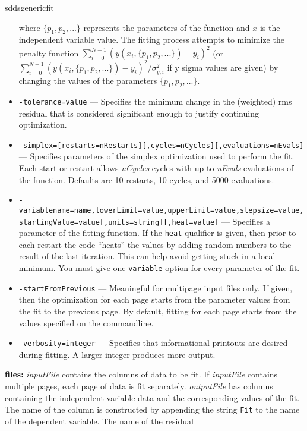 \begin{sddsprog}{sddsgenericfit}
\begin{itemize}
        where $\{p_1, p_2, ...\}$ represents the parameters of the function and $x$ is the independent variable value.
        The fitting process attempts to minimize the penalty function $\sum_{i=0}^{N-1} (y(x_i, \{p_1, p_2, ...\}) - y_i)^2$
        (or $\sum_{i=0}^{N-1} (y(x_i, \{p_1, p_2, ...\}) - y_i)^2/\sigma_{y,i}^2$ if y sigma values are given)
        by changing the values of the parameters $\{p_1, p_2, ...\}$.
      \item \verb|-tolerance=value| --- Specifies the minimum change in the (weighted) rms residual that is considered
        significant enough to justify continuing optimization.
      \item \verb|-simplex=[restarts=nRestarts][,cycles=nCycles][,evaluations=nEvals]| --- Specifies parameters of the simplex optimization used to perform the fit.
        Each start or restart allows \emph{nCycles} cycles with up to \emph{nEvals} evaluations of the function.
        Defaults are 10 restarts, 10 cycles, and 5000 evaluations.
      \item \verb|-variablename=name,lowerLimit=value,upperLimit=value,stepsize=value,startingValue=value[,units=string][,heat=value]| ---
        Specifies a parameter of the fitting function. If the \verb|heat| qualifier is given, then prior to each restart the code ``heats'' the values by adding random
        numbers to the result of the last iteration. This can help avoid getting stuck
        in a local minimum. You must give one \verb|variable| option for every parameter of the fit.
      \item \verb|-startFromPrevious| --- Meaningful for multipage input files only. If given,
        then the optimization for each page starts from the parameter values from the fit
        to the previous page. By default, fitting for each page starts from the values
        specified on the commandline.
      \item \verb|-verbosity=integer| --- Specifies that informational printouts are desired during fitting. A larger integer produces more output.
    \end{itemize}
  \item \textbf{files:} \emph{inputFile} contains the columns of data to be fit. If \emph{inputFile} contains multiple pages, each page of data is
    fit separately. \emph{outputFile} has columns containing the independent variable data and the corresponding values of the fit.
    The name of the column is constructed by appending the string \verb|Fit| to the name of the dependent variable. The name of the residual

\end{sddsprog}
